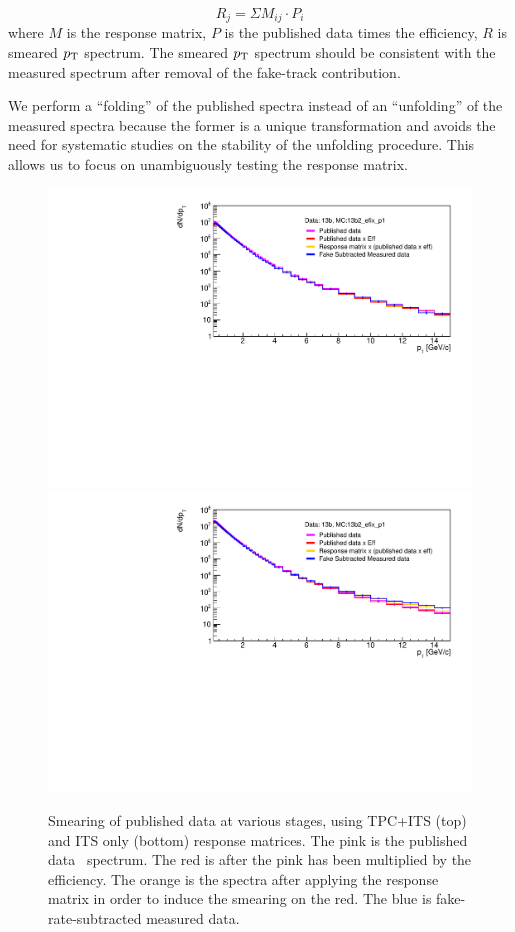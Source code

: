 \begin{equation}\label{eq:refold_eq}
R_{j} = \Sigma M_{ij} \cdot P_{i}
\end{equation}
where $M$ is the response matrix, $P$ is the published data times the efficiency, $R$ is smeared $p_{\mathrm{T}}$ spectrum. The smeared $p_{\mathrm{T}}$ spectrum should be consistent with the measured spectrum after removal of the fake-track contribution.

We perform a ``folding'' of the published spectra instead of an ``unfolding'' of the measured spectra because the former is a unique transformation and avoids the need for systematic studies on the stability of the unfolding procedure. This allows us to focus on unambiguously testing the response matrix. 

\begin{figure}[h]
\centering
\includegraphics[width=.95\textwidth]{Tracking/refolding_pPb_tpc_MBMC_0GeV15GeV_dNdpt.pdf}
\includegraphics[width=.95\textwidth]{Tracking/refolding_pPb_its_MBMC_0GeV15GeV_dNdpt.pdf}
\caption{Smearing of published data at various stages, using TPC+ITS (top) and ITS only (bottom) response matrices. The pink is the published data \pt~spectrum. The red is after the pink has been multiplied by the efficiency. The orange is the spectra after applying the response matrix in order to induce the smearing on the red. The blue is fake-rate-subtracted measured data.}
\label{fig:RefoldedComparisonSpectra}
\end{figure}


